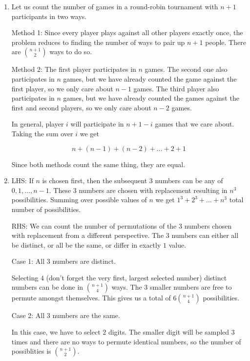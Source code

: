 \begin{enumerate}[label=(\alph*)]
\item   Let us count the number of games in a round-robin tournament with $n+1$ 
participants in two ways.
  
  Method 1: Since every player plays against all other players exactly once, 
  the problem reduces to finding the number of ways to pair up $n+1$ people. 
  There are ${n+1 \choose 2}$ ways to do so.
  
  Method 2: The first player participates in $n$ games. The second one also 
  participates in $n$ games, but we have already counted the game against the 
  first player, so we only care about $n-1$ games. The third player also 
  participates in $n$ games, but we have already counted the games against 
  the first and second players, so we only care about $n-2$ games. 
  
  In general, player $i$ will participate in $n+1-i$ games that we care about. 
  Taking the sum over $i$ we get
  
  $$n + (n-1) + (n-2) + \dots + 2 + 1$$
  
  Since both methods count the same thing, they are equal.

\item LHS: If $n$ is chosen first, then the subsequent $3$ numbers can be any 
of $0, 1, \dots, n-1$. These $3$ numbers are chosen with replacement resulting 
in $n^{3}$ possibilities. Summing over possible values of 
$n$ we get $1^{3} + 2^{3} + \dots + n^{3}$ total number of possibilities.
  
  RHS: We can count the number of permutations of the $3$ numbers chosen with 
  replacement from a different perspective. The $3$ numbers can either all be 
  distinct, or all be the same, or differ in exactly $1$ value.
  
  Case 1: All $3$ numbers are distinct.
  
  Selecting $4$ (don't forget the very first, largest selected number) 
  distinct numbers can be done in ${n+1 \choose 4}$ ways. The $3$ smaller 
  numbers are free to permute amongst themselves. This gives us a total of 
  $6{n+1 \choose 4}$ possibilities.
  
  Case 2: All $3$ numbers are the same.
  
  In this case, we have to select $2$ digits. The smaller digit will be sampled 
  $3$ times and there are no ways to permute identical numbers, so the number of 
  possiblities is ${n+1 \choose 2}$.
  

\end{enumerate}
